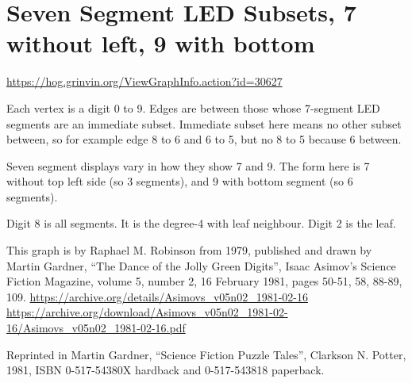 \documentclass{article}
\begin{document}
\clearpage
\section{Seven Segment LED Subsets, 7 without left, 9 with bottom}

\url{https://hog.grinvin.org/ViewGraphInfo.action?id=30627}

\medskip

Each vertex is a digit 0 to 9.  Edges are between those whose
7-segment LED segments are an immediate subset.  Immediate subset here
means no other subset between, so for example edge 8 to 6 and 6 to 5,
but no 8 to 5 because 6 between.

Seven segment displays vary in how they show 7 and 9.  The form here
is 7 without top left side (so 3 segments), and 9 with bottom segment
(so 6 segments).

Digit 8 is all segments.  It is the degree-4 with leaf neighbour.
Digit 2 is the leaf.

This graph is by Raphael M. Robinson from 1979, published and drawn by
Martin Gardner, ``The Dance of the Jolly Green Digits'', Isaac Asimov's
Science Fiction Magazine, volume 5, number 2, 16 February 1981, pages
50-51, 58, 88-89, 109. \newline
\url{https://archive.org/details/Asimovs_v05n02_1981-02-16} \newline
\url{https://archive.org/download/Asimovs_v05n02_1981-02-16/Asimovs_v05n02_1981-02-16.pdf}

Reprinted in Martin Gardner, ``Science Fiction Puzzle Tales'',
Clarkson
N. Potter, 1981, ISBN 0-517-54380X hardback and 0-517-543818
paperback.

\smallskip

\begin{center}
\end{center}
\end{document}
